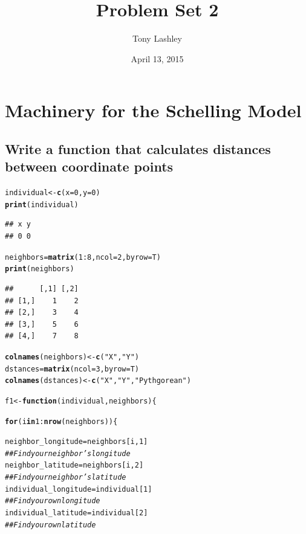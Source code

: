 \documentclass{article}\usepackage[]{graphicx}\usepackage[]{color}
\title{Problem Set 2}
\author{Tony Lashley}
\date{April 13, 2015}
\makeatletter
\newcommand{\hlnum}[1]{\textcolor[rgb]{0.686,0.059,0.569}{#1}}%
\newcommand{\hlstr}[1]{\textcolor[rgb]{0.192,0.494,0.8}{#1}}%
\newcommand{\hlcom}[1]{\textcolor[rgb]{0.678,0.584,0.686}{\textit{#1}}}%
\newcommand{\hlopt}[1]{\textcolor[rgb]{0,0,0}{#1}}%
\newcommand{\hlstd}[1]{\textcolor[rgb]{0.345,0.345,0.345}{#1}}%
\newcommand{\hlkwa}[1]{\textcolor[rgb]{0.161,0.373,0.58}{\textbf{#1}}}%
\newcommand{\hlkwb}[1]{\textcolor[rgb]{0.69,0.353,0.396}{#1}}%
\newcommand{\hlkwc}[1]{\textcolor[rgb]{0.333,0.667,0.333}{#1}}%
\newcommand{\hlkwd}[1]{\textcolor[rgb]{0.737,0.353,0.396}{\textbf{#1}}}%
\newenvironment{kframe}{%
 \def\at@end@of@kframe{}%
 \ifinner\ifhmode%
  \def\at@end@of@kframe{\end{minipage}}%
  \begin{minipage}{\columnwidth}%
 \fi\fi%
 \def\FrameCommand##1{\hskip\@totalleftmargin \hskip-\fboxsep
 \colorbox{shadecolor}{##1}\hskip-\fboxsep
     \hskip-\linewidth \hskip-\@totalleftmargin \hskip\columnwidth}%
 \MakeFramed {\advance\hsize-\width
   \@totalleftmargin\z@ \linewidth\hsize
   \@setminipage}}%
 {\par\unskip\endMakeFramed%
 \at@end@of@kframe}
\newenvironment{knitrout}{}{} %
\makeatother
\begin{document}
\maketitle

\section{Machinery for the Schelling Model}
\subsection{Write a function that calculates distances between coordinate points}
\begin{knitrout}
\color{fgcolor}\begin{kframe}
\begin{alltt}
\hlstd{individual} \hlkwb{<-} \hlkwd{c}\hlstd{(}\hlkwc{x} \hlstd{=} \hlnum{0}\hlstd{,}\hlkwc{y} \hlstd{=} \hlnum{0}\hlstd{)}
\hlkwd{print}\hlstd{(individual)}
\end{alltt}
\begin{verbatim}
## x y 
## 0 0
\end{verbatim}
\begin{alltt}
\hlstd{neighbors} \hlkwb{=} \hlkwd{matrix}\hlstd{(}\hlnum{1}\hlopt{:}\hlnum{8}\hlstd{,} \hlkwc{ncol} \hlstd{=} \hlnum{2}\hlstd{,} \hlkwc{byrow} \hlstd{= T)}
\hlkwd{print}\hlstd{(neighbors)}
\end{alltt}
\begin{verbatim}
##      [,1] [,2]
## [1,]    1    2
## [2,]    3    4
## [3,]    5    6
## [4,]    7    8
\end{verbatim}
\begin{alltt}
\hlkwd{colnames}\hlstd{(neighbors)} \hlkwb{<-} \hlkwd{c}\hlstd{(}\hlstr{"X"}\hlstd{,}\hlstr{"Y"}\hlstd{)}
\hlstd{dstances} \hlkwb{=} \hlkwd{matrix}\hlstd{(}\hlkwc{ncol} \hlstd{=} \hlnum{3}\hlstd{,} \hlkwc{byrow} \hlstd{= T)}
\hlkwd{colnames}\hlstd{(dstances)} \hlkwb{<-} \hlkwd{c}\hlstd{(}\hlstr{"X"}\hlstd{,}\hlstr{"Y"}\hlstd{,} \hlstr{"Pythgorean"}\hlstd{)}

\hlstd{f1} \hlkwb{<-} \hlkwa{function}\hlstd{(}\hlkwc{individual}\hlstd{,} \hlkwc{neighbors}\hlstd{)\{}

  \hlkwa{for} \hlstd{(i} \hlkwa{in} \hlnum{1}\hlopt{:}\hlkwd{nrow}\hlstd{(neighbors))\{}

    \hlstd{neighbor_longitude} \hlkwb{=} \hlstd{neighbors[i,}\hlnum{1}\hlstd{]}
    \hlcom{## Find your neighbor's longitude}
    \hlstd{neighbor_latitude} \hlkwb{=}  \hlstd{neighbors[i,}\hlnum{2}\hlstd{]}
    \hlcom{## Find your neighbor's latitude}
    \hlstd{individual_longitude} \hlkwb{=} \hlstd{individual[}\hlnum{1}\hlstd{]}
    \hlcom{## Find your own longitude}
    \hlstd{individual_latitude} \hlkwb{=}  \hlstd{individual[}\hlnum{2}\hlstd{]}
    \hlcom{## Find your own latitude}


\end{alltt}
\end{kframe}
\end{knitrout}
\end{document}
